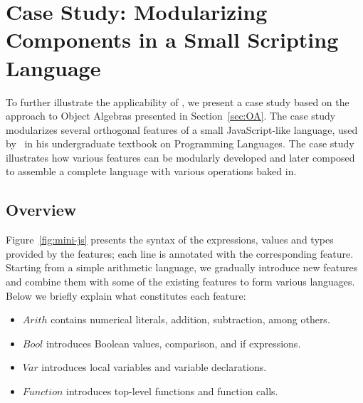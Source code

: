 \section{Case Study: Modularizing Components in a Small Scripting Language}

To further illustrate the applicability of \name, we present a case study based
on the approach to Object Algebras presented in Section~\ref{sec:OA}. The case
study modularizes several orthogonal features of a small
JavaScript-like language, used by~\citet{poplcook} in his undergraduate textbook
on Programming Languages. The case study illustrates how various features can be
modularly developed and later composed to assemble a complete language with
various operations baked in.



\subsection{Overview}

Figure~\ref{fig:mini-js} presents the syntax of the expressions, values and
types provided by the features; each line is annotated with the corresponding
feature. Starting from a simple arithmetic language, we gradually introduce new
features and combine them with some of the existing features to form various
languages. Below we briefly explain what constitutes each feature:
\begin{itemize}
\item $\mathit{Arith}$ contains numerical literals, addition, subtraction, among
  others.
\item $\mathit{Bool}$ introduces Boolean values, comparison, and if expressions.
\item $\mathit{Var}$ introduces local variables and variable declarations.
\item $\mathit{Function}$ introduces top-level functions and function calls.
\end{itemize}

